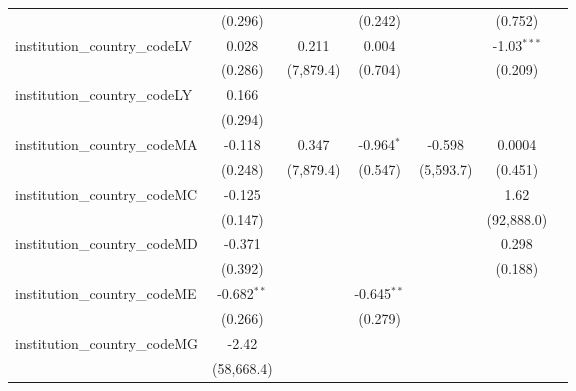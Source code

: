 \begin{tabular}{lcccccc}
                                         & (0.296)        &               & (0.242)        &               & (0.752)        &   \\   
   institution\_country\_codeLV          & 0.028          & 0.211         & 0.004          &               & -1.03$^{***}$  &   \\   
                                         & (0.286)        & (7,879.4)     & (0.704)        &               & (0.209)        &   \\   
   institution\_country\_codeLY          & 0.166          &               &                &               &                &   \\   
                                         & (0.294)        &               &                &               &                &   \\   
   institution\_country\_codeMA          & -0.118         & 0.347         & -0.964$^{*}$   & -0.598        & 0.0004         &   \\   
                                         & (0.248)        & (7,879.4)     & (0.547)        & (5,593.7)     & (0.451)        &   \\   
   institution\_country\_codeMC          & -0.125         &               &                &               & 1.62           &   \\   
                                         & (0.147)        &               &                &               & (92,888.0)     &   \\   
   institution\_country\_codeMD          & -0.371         &               &                &               & 0.298          &   \\   
                                         & (0.392)        &               &                &               & (0.188)        &   \\   
   institution\_country\_codeME          & -0.682$^{**}$  &               & -0.645$^{**}$  &               &                &   \\   
                                         & (0.266)        &               & (0.279)        &               &                &   \\   
   institution\_country\_codeMG          & -2.42          &               &                &               &                &   \\   
                                         & (58,668.4)     &               &                &               &                &   \\   

\end{tabular}
